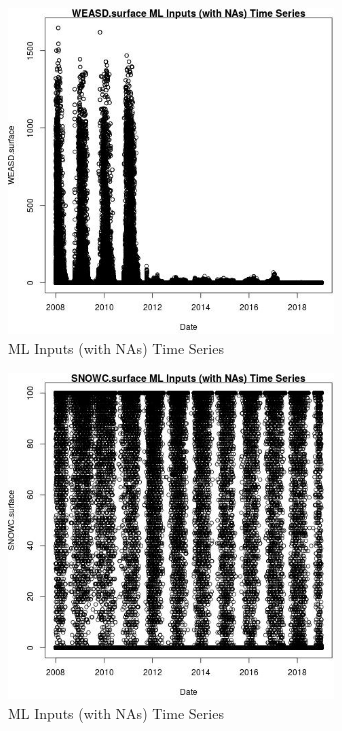 \begin{figure} 
\centering  
\includegraphics[width=0.77\textwidth]{Code_Outputs/Report_ML_input_PM25_Step4_part_f_de_duplicated_aves_prioritize_24hr_obswNAs_WEASDsurfacevDate.jpg} 
\caption{\label{fig:Report_ML_input_PM25_Step4_part_f_de_duplicated_aves_prioritize_24hr_obswNAsWEASDsurfacevDate}ML Inputs (with NAs) Time Series} 
\end{figure} 
 

\begin{figure} 
\centering  
\includegraphics[width=0.77\textwidth]{Code_Outputs/Report_ML_input_PM25_Step4_part_f_de_duplicated_aves_prioritize_24hr_obswNAs_SNOWCsurfacevDate.jpg} 
\caption{\label{fig:Report_ML_input_PM25_Step4_part_f_de_duplicated_aves_prioritize_24hr_obswNAsSNOWCsurfacevDate}ML Inputs (with NAs) Time Series} 
\end{figure} 
 

